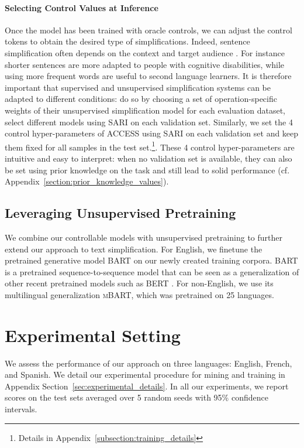 \documentclass[11pt]{article}
\newcommand{\bart}{\textsc{BART}\xspace}
\newcommand{\mbart}{\textsc{mBART}\xspace}
\newcommand{\access}{\mbox{\textsc{ACCESS}}\xspace}
\begin{document}
\paragraph{Selecting Control Values at Inference}
Once the model has been trained with oracle controls, we can adjust the control tokens to obtain the desired type of simplifications.
Indeed, sentence simplification often depends on the context and target audience \cite{martin2020controllable}.
For instance shorter sentences are more adapted to people with cognitive disabilities, while using more frequent words are useful to second language learners.
It is therefore important that supervised and unsupervised simplification systems can be adapted to different conditions: \citep{kumar-etal-2020-iterative} do so by choosing a set of operation-specific weights of their unsupervised simplification model for each evaluation dataset, \citep{surya2018unsupervised} select different models using SARI on each validation set.
Similarly, we set the 4 control hyper-parameters of \access using SARI on each validation set and keep them fixed for all samples in the test set.\footnote{Details in Appendix~\ref{subsection:training_details}}.
These 4 control hyper-parameters are intuitive and easy to interpret: when no validation set is available, they can also be set using prior knowledge on the task and still lead to solid performance (cf. Appendix~\ref{section:prior_knowledge_values}).









 
\subsection{Leveraging Unsupervised Pretraining}
We combine our controllable models with unsupervised pretraining to further extend our approach to text simplification. For English, we finetune the pretrained generative model \bart \cite{lewis2019bart} on our newly created training corpora. \bart is a pretrained sequence-to-sequence model that can be seen as a generalization of other recent pretrained models such as BERT \cite{devlin2018bert}.
For non-English, we use its multilingual generalization \mbart \cite{liu2020multilingual}, which was pretrained on 25 languages.
\iffalse We show in Section~\ref{sub@subfigure:ablation_bart_and_access} that \bart and \access work particularly well when used together.\fi{} \section{Experimental Setting}
We assess the performance of our approach on three languages: English, French, and Spanish.
We detail our experimental procedure for mining and training in Appendix Section~\ref{sec:experimental_details}.
In all our experiments, we report scores on the test sets averaged over 5 random seeds with 95\% confidence intervals.
\end{document}
